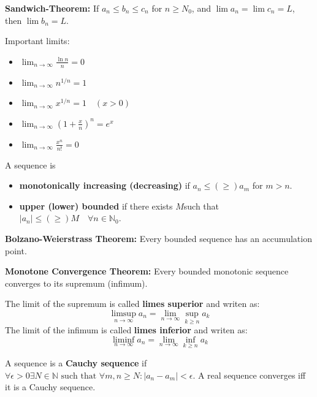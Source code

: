 \begin{theorem}
\textbf{Sandwich-Theorem:} If $a_n \le b_n \le c_n$ for $n \ge N_0$, and $\lim a_n = \lim c_n = L$, then $\lim b_n = L$.
\end{theorem}

\begin{remark}
Important limits:
\begin{itemize}
    \item $\lim_{n \to \infty} \frac{\ln n}{n} = 0$
    \item $\lim_{n \to \infty} n^{1/n} = 1$
    \item $\lim_{n \to \infty} x^{1/n} = 1 \quad (x \gt 0)$
    \item $\lim_{n \to \infty} \left(1 + \frac{x}{n}\right)^n = e^x$
    \item $\lim_{n \to \infty} \frac{x^n}{n!} = 0$
\end{itemize}
\end{remark}

\begin{definition}
A sequence is
\begin{itemize}
    \item \textbf{monotonically increasing (decreasing)} if $a_n \le (\geq) a_m$ for $m \gt n$.
    \item \textbf{upper (lower) bounded} if there exists $M$such that $|a_n| \le (\geq) M \quad \forall n \in \mathbb{N}_0$.
\end{itemize}
\end{definition}

\begin{theorem}
\textbf{Bolzano-Weierstrass Theorem:} Every bounded sequence has an accumulation point.
\end{theorem}

\begin{theorem}
\textbf{Monotone Convergence Theorem:} Every bounded monotonic sequence converges to its supremum (infimum).
\end{theorem}

\begin{definition}
The limit of the supremum is called \textbf{limes superior} and writen as:
$$\limsup_{n \to \infty} a_n = \lim_{n \to \infty} \sup_{k \ge n} a_k$$
The limit of the infimum is called \textbf{limes inferior} and writen as:
$$\liminf_{n \to \infty} a_n = \lim_{n \to \infty} \inf_{k \ge n} a_k$$
\end{definition}

\begin{definition}
A sequence is a \textbf{Cauchy sequence} if $\forall \epsilon \gt 0 \exists N \in \mathbb{N} \text{ such that } \forall m, n \ge N : |a_n - a_m| \lt \epsilon$.
A real sequence converges iff it is a Cauchy sequence.
\end{definition}

